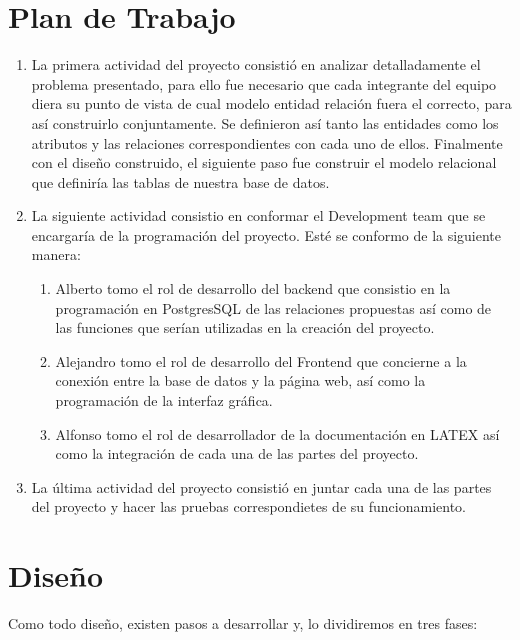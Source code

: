 \documentclass[10pt]{report}
\begin{document}
\chapter*{Plan de Trabajo}

\begin{enumerate}
    \item La primera actividad del proyecto consistió en analizar detalladamente el problema presentado, para ello fue necesario que cada integrante del equipo diera su punto de vista de cual modelo entidad relación fuera el correcto, para así construirlo conjuntamente. Se definieron así tanto las entidades como los atributos y las relaciones correspondientes con cada uno de ellos. Finalmente con el diseño construido, el siguiente paso fue construir el modelo relacional que definiría las tablas de nuestra base de datos.
    
    \item La siguiente actividad consistio en conformar el Development team que se encargaría de la programación del proyecto. Esté se conformo de la siguiente manera:
    
        \begin{enumerate}
            \item Alberto tomo el rol de desarrollo del backend que consistio en la programación en PostgresSQL de las relaciones propuestas así como de las funciones que serían utilizadas en la creación del proyecto.
            \item Alejandro tomo el rol de desarrollo del Frontend que concierne a la conexión entre la base de datos y la página web, así como la programación de la interfaz gráfica.
            \item Alfonso tomo el rol de desarrollador de la documentación en LATEX así como la integración de cada una de las partes del proyecto.
        \end{enumerate}
    
    \item La última actividad del proyecto  consistió en juntar cada una de las partes del proyecto y hacer las pruebas correspondietes de su funcionamiento. 



\end{enumerate}


\chapter*{Diseño}
\setlength{\parskip}{-5mm}
Como todo diseño, existen pasos a desarrollar y, lo dividiremos en tres fases: 
\end{document}
